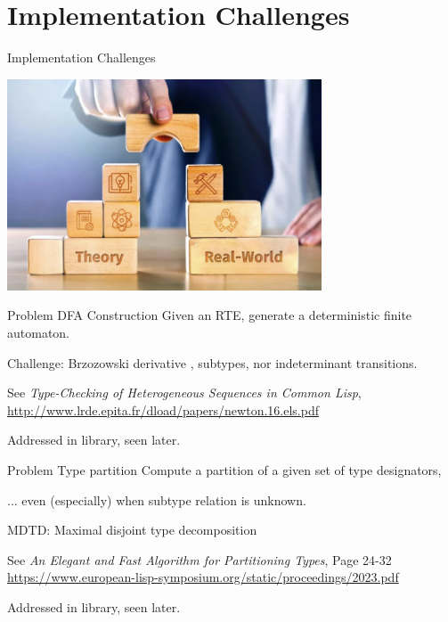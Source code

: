 \section{Implementation Challenges}

{  
  \begin{frame}{Implementation Challenges}
      
  \centering
  \includegraphics[width=0.7\textwidth]{theoretic-challenge.png}
\end{frame}
}

\begin{frame}{Problem }{DFA Construction}
  Given an RTE, generate a deterministic finite automaton.

  \medskip
  
  Challenge: Brzozowski derivative , subtypes, nor indeterminant transitions.

  \medskip
  
  See \emph{Type-Checking of Heterogeneous Sequences in Common Lisp}, \url{http://www.lrde.epita.fr/dload/papers/newton.16.els.pdf}

  \medskip

  Addressed in  library, seen later.
\end{frame}

\begin{frame}{Problem }{Type partition}
  Compute a partition of a given set of type designators,

  \medskip
  
  ... even (especially) when subtype relation is unknown.

  \medskip
  
  MDTD: Maximal disjoint type decomposition

  \medskip
  
  See \emph{An Elegant and Fast Algorithm for Partitioning Types}, Page 24-32 \url{https://www.european-lisp-symposium.org/static/proceedings/2023.pdf}

  \medskip
  
  Addressed in  library, seen later.
\end{frame}

